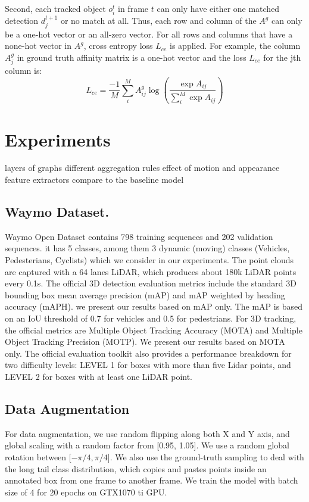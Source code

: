 \documentclass[10pt,twocolumn,letterpaper]{article}
\begin{document}
Second, each tracked object $o^{t}_{i}$ in frame $t$ can only have either one matched detection $d^{t+1}_{j}$ or no match at all. Thus, each row and column of the $A^{g}$ can only be a one-hot vector or an all-zero vector. For all rows and columns that have a none-hot vector in $A^{g}$, cross entropy loss $L_{ce}$ is applied. For example, the column $A^{g}_{j}$ in ground truth affinity matrix is a one-hot vector and the loss $L_{ce}$ for the jth column is:
\begin{equation}
L_{ce} = \frac{-1}{M}\sum^{M}_{i} A^{g}_{ij}\log(\frac{\exp{A_{ij}}}{\sum^{M}_{i}\exp{A_{ij}}})
\end{equation}




\section{Experiments}
layers of graphs
different aggregation rules
effect of motion and appearance feature extractors
compare to the baseline model

\subsection{Waymo Dataset.} Waymo Open Dataset \cite{} contains 798 training sequences and 202 validation sequences. it has 5 classes, among them 3 dynamic (moving) classes (Vehicles, Pedesterians, Cyclists) which we consider in our experiments. The point clouds are captured with a 64 lanes LiDAR, which produces about 180k LiDAR points every 0.1s. The official 3D detection evaluation metrics include the standard 3D bounding box mean average precision (mAP) and mAP weighted by heading accuracy (mAPH). we present our results based on mAP only.  The mAP is based on an IoU threshold of 0.7 for vehicles and 0.5 for pedestrians. For 3D tracking, the official metrics are Multiple Object Tracking Accuracy (MOTA) and Multiple Object Tracking Precision (MOTP). We present our results based on MOTA only. The official evaluation toolkit also provides a performance breakdown for two difficulty levels: LEVEL 1 for boxes with more than five Lidar points, and LEVEL 2 for boxes with at least one LiDAR point.
\subsection{Data Augmentation}
For data augmentation, we use random flipping along both X and Y axis, and global scaling with a random factor from [0.95, 1.05]. We use a random global rotation between [$ -\pi/4, \pi/4$]. We also use the ground-truth sampling \cite{yan2018second} to deal with the long tail class distribution, which copies and pastes points inside an annotated box from one frame to another frame. We train the model with batch size of 4 for 20 epochs on GTX1070 ti GPU.
\end{document}
